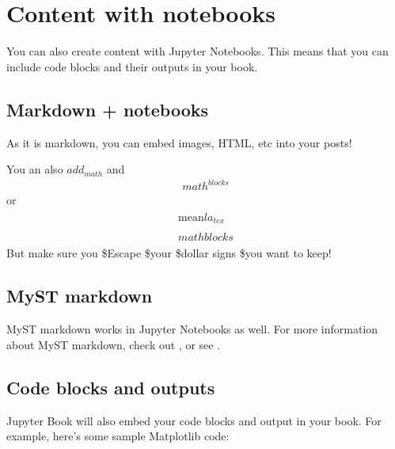 \documentclass[letterpaper,10pt,english]{jupyterBook}
\begin{document}
\section{Content with notebooks}
\label{\detokenize{notebooks:content-with-notebooks}}\label{\detokenize{notebooks::doc}}
\sphinxAtStartPar
You can also create content with Jupyter Notebooks. This means that you can include
code blocks and their outputs in your book.


\subsection{Markdown + notebooks}
\label{\detokenize{notebooks:markdown-notebooks}}
\sphinxAtStartPar
As it is markdown, you can embed images, HTML, etc into your posts!

\sphinxAtStartPar


\sphinxAtStartPar
You an also \(add_{math}\) and
\begin{equation*}
\begin{split}
math^{blocks}
\end{split}
\end{equation*}
\sphinxAtStartPar
or
\begin{equation*}
\begin{split}
\begin{aligned}
\mbox{mean} la_{tex} \\ \\
math blocks
\end{aligned}
\end{split}
\end{equation*}
\sphinxAtStartPar
But make sure you \$Escape \$your \$dollar signs \$you want to keep!


\subsection{MyST markdown}
\label{\detokenize{notebooks:myst-markdown}}
\sphinxAtStartPar
MyST markdown works in Jupyter Notebooks as well. For more information about MyST markdown, check
out ,
or see .


\subsection{Code blocks and outputs}
\label{\detokenize{notebooks:code-blocks-and-outputs}}
\sphinxAtStartPar
Jupyter Book will also embed your code blocks and output in your book.
For example, here’s some sample Matplotlib code:
\end{document}
